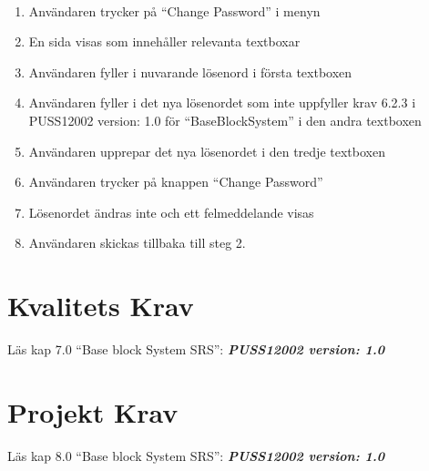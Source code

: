 \documentclass[paper=a4, fontsize=11pt,twoside]{article}
\begin{document}
	\paragraph{}
	\begin{enumerate}
		\item  Användaren trycker på “Change Password” i menyn
		\item	 En sida visas som innehåller relevanta textboxar
		\item	Användaren fyller i nuvarande lösenord i första textboxen
		\item	Användaren fyller i det nya lösenordet som inte uppfyller krav 6.2.3 i PUSS12002 version: 1.0 för “BaseBlockSystem” i den andra textboxen
		\item	Användaren upprepar det nya lösenordet i den tredje textboxen
		\item	Användaren trycker på knappen “Change Password”
		\item	Lösenordet ändras inte och ett felmeddelande visas
		\item Användaren skickas tillbaka till steg 2.
		
	\end{enumerate}
	
	\section{Kvalitets Krav}
	Läs kap 7.0  “Base block System SRS”:   \textbf{\textit{PUSS12002 version: 1.0}} 
	\section{Projekt Krav}
	Läs kap 8.0  “Base block System SRS”:   \textbf{\textit{PUSS12002 version: 1.0}} 
\end{document}
